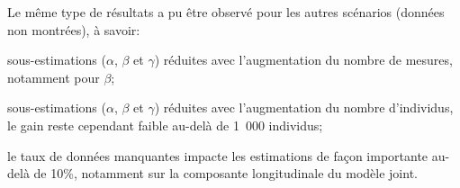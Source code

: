 \documentclass[11pt, a4paper]{article}
\begin{document}
\newpage
\par{
Le même type de résultats a pu être observé pour les autres scénarios (données non montrées), à savoir:
\begin{description}
    \addtolength{\itemindent}{1cm}
    \item[Scénario 2] sous-estimations ($\alpha$, $\beta$ et $\gamma$) réduites avec l'augmentation du nombre de mesures, notamment pour $\beta$;
    \item[Scénario 3] sous-estimations ($\alpha$, $\beta$ et $\gamma$) réduites avec l'augmentation du nombre d'individus, le gain reste cependant faible au-delà de 1~000 individus;
    \item[Scénario 4-5] le taux de données manquantes impacte les estimations de façon importante au-delà de 10\%, notamment sur la composante longitudinale du modèle joint.
\end{description}
}
\end{document}
